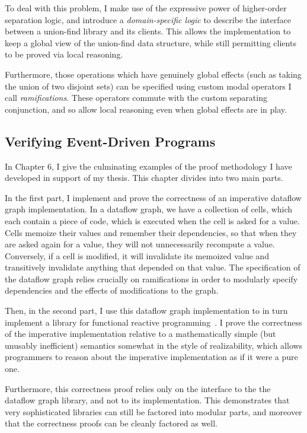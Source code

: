 To deal with this problem, I make use of the expressive power of
higher-order separation logic, and introduce a \emph{domain-specific
  logic} to describe the interface between a union-find library and
its clients. This allows the implementation to keep a global view of
the union-find data structure, while still permitting clients to be
proved via local reasoning.

Furthermore, those operations which have genuinely global effects
(such as taking the union of two disjoint sets) can be specified using
custom modal operators I call \emph{ramifications}. These operators
commute with the custom separating conjunction, and so allow local
reasoning even when global effects are in play.

\subsection{Verifying Event-Driven Programs}

In Chapter 6, I give the culminating examples of the proof methodology
I have developed in support of my thesis. This chapter divides into 
two main parts. 

In the first part, I implement and prove the correctness of an
imperative dataflow graph implementation. In a dataflow graph, we have
a collection of cells, which each contain a piece of code, which is
executed when the cell is asked for a value. Cells memoize their
values and remember their dependencies, so that when they are asked
again for a value, they will not unnecessarily recompute a
value. Conversely, if a cell is modified, it will invalidate its
memoized value and transitively invalidate anything that depended on
that value.  The specification of the dataflow graph relies crucially
on ramifications in order to modularly specify dependencies and the
effects of modifications to the graph.

Then, in the second part, I use this dataflow graph implementation to
in turn implement a library for functional reactive
programming~\cite{frp}. I prove the correctness of the imperative
implementation relative to a mathematically simple (but unusably
inefficient) semantics somewhat in the style of realizability, which
allows programmers to reason about the imperative implementation as if
it were a pure one. 

Furthermore, this correctness proof relies only on the interface to
the the dataflow graph library, and not to its implementation. This
demonstrates that very sophisticated libraries can still be factored
into modular parts, and moreover that the correctness proofs can be
cleanly factored as well. 

